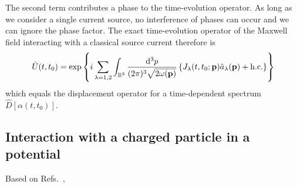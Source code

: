 The second term contributes a phase to the time-evolution operator.
As long as we consider a single current source, no interference of phases can occur and we can ignore the phase factor.
The exact time-evolution operator of the Maxwell field interacting with a classical source current therefore is
\begin{equation}
	\hat{U}(t,t_0)
	=
	\exp\left\{
		i\sum_{\lambda=1,2}
		\int_{\mathbb{R}^3}\frac{\dd[3]{p}}{(2\pi)^3\sqrt{2\omega(\vb{p})}}
		\left\{
			J_\lambda(t,t_0;\vb{p})
			\hat{a}_\lambda(\vb{p})
			+
			\text{h.c.}
		\right\}
	\right\}
\end{equation}
which equals the displacement operator for a time-dependent spectrum $\hat{D}[\alpha(t,t_0)]$.

\subsection{Interaction with a charged particle in a potential}

Based on Refs.~\cite[p.~687]{Mandel1995},~\cite[p.~128]{Cohen1992}

